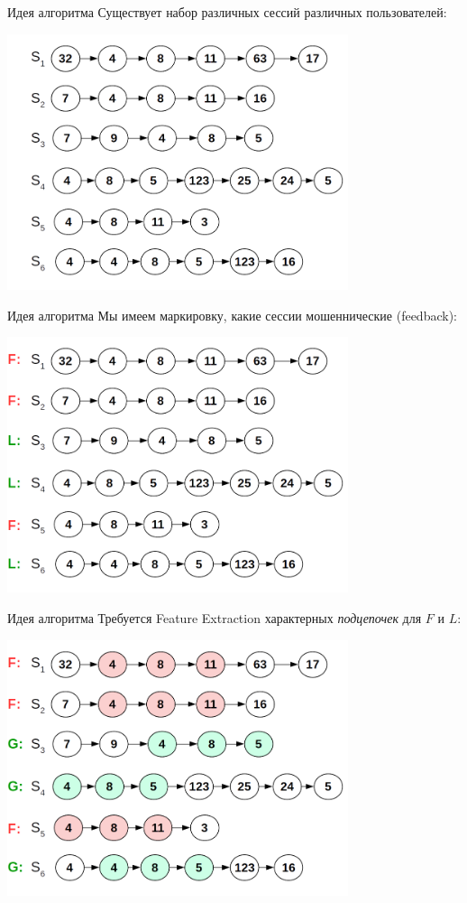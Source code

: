 \begin{frame}{Идея алгоритма}
	\small
	Существует набор различных сессий различных пользователей:
	\begin{center}
		\includegraphics[width=10cm]{../pic/beh/idea_1.png}\centering
	\end{center}
\end{frame}

\begin{frame}{Идея алгоритма}
	\small
	Мы имеем маркировку, какие сессии мошеннические (feedback):
	\begin{center}
		\includegraphics[width=10cm]{../pic/beh/idea_2.png}\centering
	\end{center}
\end{frame}

\begin{frame}{Идея алгоритма}
	\small
	Требуется Feature Extraction характерных \textit{подцепочек} для $F$ и $L$:
	\begin{center}
		\includegraphics[width=10cm]{../pic/beh/idea_3.png}\centering
	\end{center}
\end{frame}

